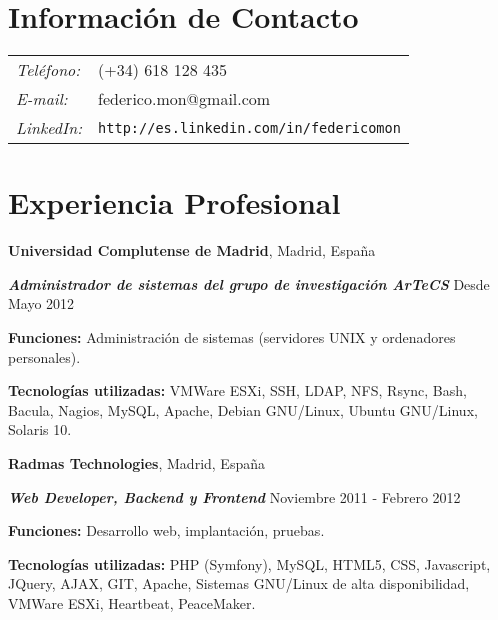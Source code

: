 \documentclass[margin,line]{resume}
\begin{document}
\address{Ingeniero en Informática}

\begin{resume}
\section{\sc Información de Contacto}
\vspace{.05in}
\begin{tabular}{@{}p{0.5in}p{2in}}
{\it Teléfono:} &(+34) 618 128 435 \\
{\it E-mail:} &{ federico.mon@gmail.com}\\
{\it LinkedIn:} &{ \tt http://es.linkedin.com/in/federicomon}\\
\end{tabular}

\section{\sc Experiencia Profesional}
{\bf Universidad Complutense de Madrid}, Madrid, España

\vspace{-.3cm}
{\bf \em Administrador de sistemas del grupo de investigación ArTeCS} \hfill
{ Desde Mayo 2012
}
\begin{list2}
\vspace*{.05in}
\item {\bf Funciones: }{Administración de sistemas (servidores UNIX y 
        ordenadores personales).}
\item {\bf Tecnologías utilizadas: }{VMWare ESXi, SSH, LDAP, NFS, Rsync, Bash, 
        Bacula, Nagios, MySQL, Apache, Debian GNU/Linux, Ubuntu GNU/Linux, 
        Solaris 10.}
\end{list2}

{\bf Radmas Technologies}, Madrid, España

\vspace{-.3cm}
{\bf \em Web Developer, Backend y Frontend} \hfill
{ Noviembre 2011 - Febrero 2012
}

\begin{list2}
\vspace*{.05in}
\item {\bf Funciones: }{Desarrollo web, implantación, pruebas.}
\item {\bf Tecnologías utilizadas: }{PHP (Symfony), MySQL, HTML5, CSS,
Javascript, JQuery, AJAX, GIT, Apache, Sistemas GNU/Linux de alta
disponibilidad, VMWare ESXi, Heartbeat, PeaceMaker.}
\end{list2}


\end{resume}
\end{document}
